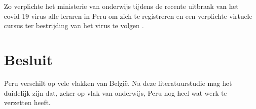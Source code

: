 Zo verplichte het ministerie van onderwijs tijdens de recente uitbraak van het covid-19 virus alle leraren in Peru om zich te registreren en een verplichte virtuele cursus ter bestrijding van het virus te volgen \autocite{Educacion2020}.

\section{Besluit}
Peru verschilt op vele vlakken van België. Na deze literatuurstudie mag het duidelijk zijn dat, zeker op vlak van onderwijs, Peru nog heel wat werk te verzetten heeft.


